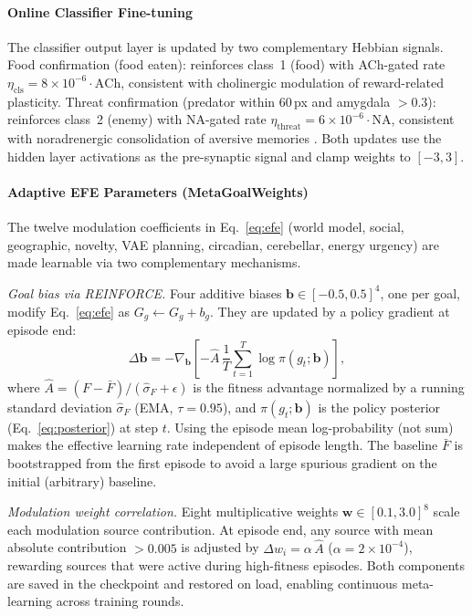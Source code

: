 \documentclass[12pt]{article}
\begin{document}
\paragraph{Online Classifier Fine-tuning}

The classifier output layer is updated by two complementary
Hebbian signals.
Food confirmation (food eaten): reinforces class~1 (food) with
ACh-gated rate $\eta_\text{cls} = 8 \times 10^{-6} \cdot \text{ACh}$,
consistent with cholinergic modulation of reward-related plasticity.
Threat confirmation (predator within 60\,px and amygdala $>0.3$):
reinforces class~2 (enemy) with NA-gated rate
$\eta_\text{threat} = 6 \times 10^{-6} \cdot \text{NA}$,
consistent with noradrenergic consolidation of aversive memories
\citep{sara2009}.
Both updates use the hidden layer activations as the pre-synaptic
signal and clamp weights to $[-3, 3]$.

\paragraph{Adaptive EFE Parameters (MetaGoalWeights)}\label{par:metagoal}

The twelve modulation coefficients in Eq.~\ref{eq:efe} (world model,
social, geographic, novelty, VAE planning, circadian, cerebellar,
energy urgency) are made learnable via two complementary mechanisms.

\textit{Goal bias via REINFORCE.}
Four additive biases $\mathbf{b} \in [-0.5, 0.5]^4$, one per goal,
modify Eq.~\ref{eq:efe} as $G_g \leftarrow G_g + b_g$.
They are updated by a policy gradient at episode end:
\begin{equation}\label{eq:reinforce}
  \Delta\mathbf{b} = -\nabla_\mathbf{b}
    \!\left[-\hat{A}\,\frac{1}{T}\sum_{t=1}^T \log\pi(g_t;\mathbf{b})\right],
\end{equation}
where $\hat{A} = (F - \bar{F})/(\hat{\sigma}_F + \epsilon)$ is the
fitness advantage normalized by a running standard deviation
$\hat{\sigma}_F$ (EMA, $\tau=0.95$), and $\pi(g_t;\mathbf{b})$
is the policy posterior (Eq.~\ref{eq:posterior}) at step $t$.
Using the episode mean log-probability (not sum) makes the effective
learning rate independent of episode length.
The baseline $\bar{F}$ is bootstrapped from the first episode to
avoid a large spurious gradient on the initial (arbitrary) baseline.

\textit{Modulation weight correlation.}
Eight multiplicative weights $\mathbf{w} \in [0.1, 3.0]^8$ scale each
modulation source contribution.
At episode end, any source with mean absolute contribution $>0.005$
is adjusted by $\Delta w_i = \alpha\,\hat{A}$ ($\alpha = 2\times10^{-4}$),
rewarding sources that were active during high-fitness episodes.
Both components are saved in the checkpoint and restored on load,
enabling continuous meta-learning across training rounds.
\end{document}

